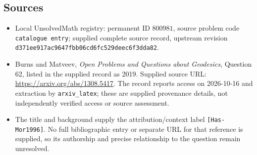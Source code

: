 \documentclass[11pt]{article}
\begin{document}
\subsection{Sources}
\begin{itemize}
\item Local UnsolvedMath registry: permanent ID \(800981\), source problem code \texttt{catalogue entry}; supplied complete source record, upstream revision \texttt{d371ee917ac9647fbb06cd6fc529deec6f3dda82}.
\item Burns and Matveev, \emph{Open Problems and Questions about Geodesics}, Question 62, listed in the supplied record as 2019. Supplied source URL: \url{https://arxiv.org/abs/1308.5417}. The record reports access on 2026-10-16 and extraction by \texttt{arxiv\_latex}; these are supplied provenance details, not independently verified access or source assessment.
\item The title and background supply the attribution/context label \texttt{[Has-Mor1996]}. No full bibliographic entry or separate URL for that reference is supplied, so its authorship and precise relationship to the question remain unresolved.
\end{itemize}
\end{document}

